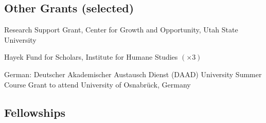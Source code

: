 \documentclass[12pt,letterpaper]{report}
\begin{document}


   \subsection*{Other Grants (selected)}

   	\begin{tablist}

\item [2018-19] \tab Research Support Grant, Center for Growth and Opportunity, Utah State University
\item [2018] \tab Hayek Fund for Scholars, Institute for Humane Studies $(\times 3)$
\item [2011] \tab German: Deutscher Akademischer Austausch Dienst (DAAD) University Summer \\Course Grant to attend University of Osnabr\"{u}ck, Germany


   	\end{tablist}


    \subsection*{Fellowships}
\end{document}
